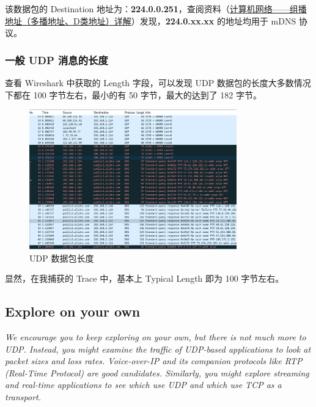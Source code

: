 \documentclass[14pt,a4paper,UTF8,twoside]{article}
\begin{document}
该数据包的 Destination 地址为：\textbf{224.0.0.251}，查阅资料（\href{https://blog.csdn.net/m0_51551385/article/details/122327966}{计算机网络——组播地址（多播地址、D类地址）详解}）发现，\textbf{224.0.xx.xx} 的地址均用于 mDNS 协议。

\subsubsection{一般 UDP 消息的长度}

查看 Wireshark 中获取的 Length 字段，可以发现 UDP 数据包的长度大多数情况下都在 100 字节左右，最小的有 50 字节，最大的达到了 182 字节。

\begin{figure}[H]
    \centering
    \includegraphics[width=0.8\textwidth]{lab5/length.png}
    \caption{UDP 数据包长度}
\end{figure}

显然，在我捕获的 Trace 中，基本上 Typical Length 即为 100 字节左右。

\subsection{Explore on your own}

\begin{mdframed}[backgroundcolor=gray!10, linewidth=0.8pt, roundcorner=5pt]
    \textit{We encourage you to keep exploring on your own, but there is not much more to UDP. Instead, you might examine the traffic of UDP-based applications to look at packet sizes and loss rates. Voice-over-IP and its companion protocols like RTP (Real-Time Protocol) are good candidates. Similarly, you might explore streaming and real-time applications to see which use UDP and which use TCP as a transport.}
\end{mdframed}
\end{document}
